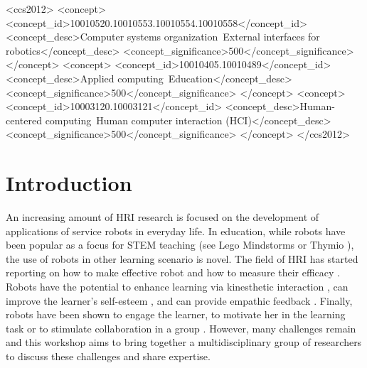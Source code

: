 \documentclass{sig-alternate-05-2015}
\newcommand{\comments}[1]{\todo[inline,linecolor=blue,backgroundcolor=blue!15,bordercolor=blue]{#1}}
\begin{document}
%
%
\begin{CCSXML}
	<ccs2012>
	<concept>
	<concept_id>10010520.10010553.10010554.10010558</concept_id>
	<concept_desc>Computer systems organization~External interfaces for robotics</concept_desc>
	<concept_significance>500</concept_significance>
	</concept>
	<concept>
	<concept_id>10010405.10010489</concept_id>
	<concept_desc>Applied computing~Education</concept_desc>
	<concept_significance>500</concept_significance>
	</concept>
	<concept>
	<concept_id>10003120.10003121</concept_id>
	<concept_desc>Human-centered computing~Human computer interaction (HCI)</concept_desc>
	<concept_significance>500</concept_significance>
	</concept>
	</ccs2012>
\end{CCSXML}


%
%

%
%


\section{Introduction}
An increasing amount of HRI research is focused on the development of applications of service robots in everyday life. 
In education, while robots have been popular as a focus for STEM 
teaching (see Lego Mindstorms or Thymio \cite{riedo2012two}), the use of robots in other learning scenario is novel. The field of HRI has started reporting on how to make 
effective robot and how to measure their efficacy 
\cite{kennedy2016social,tanaka2015pepper}. Robots have the 
potential to enhance learning via kinesthetic interaction \cite{lemaignan2016,tanaka2012}, can improve 
the learner's self-esteem \cite{lemaignan2016}, and can provide empathic feedback 
\cite{castellano2013towards}. Finally, robots have been shown to engage the 
learner, to motivate her in the learning task or to stimulate collaboration in a 
group \cite{}. However, many challenges remain and this workshop aims to bring 
together a multidisciplinary group of researchers to discuss these challenges 
and share expertise.
\end{document}
